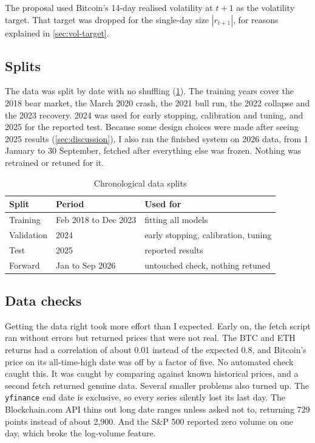 The proposal used Bitcoin's 14-day realised volatility at $t+1$ as the volatility target. That target was dropped for the single-day size $|r_{t+1}|$, for reasons explained in \cref{sec:vol-target}.

\subsection{Splits}

The data was split by date with no shuffling (\cref{tab:splits}). The training years cover the 2018 bear market, the March 2020 crash, the 2021 bull run, the 2022 collapse and the 2023 recovery. 2024 was used for early stopping, calibration and tuning, and 2025 for the reported test. Because some design choices were made after seeing 2025 results (\cref{sec:discussion}), I also ran the finished system on 2026 data, from 1 January to 30 September, fetched after everything else was frozen. Nothing was retrained or retuned for it.

\begin{table}[!t]
  \centering
  \caption{Chronological data splits}
  \label{tab:splits}
  \footnotesize
  \begin{tabularx}{\columnwidth}{@{}llX@{}}
    \toprule
    Split & Period & Used for \\
    \midrule
    Training   & Feb 2018 to Dec 2023 & fitting all models \\
    Validation & 2024 & early stopping, calibration, tuning \\
    Test       & 2025 & reported results \\
    Forward    & Jan to Sep 2026 & untouched check, nothing retuned \\
    \bottomrule
  \end{tabularx}
\end{table}

\subsection{Data checks}

Getting the data right took more effort than I expected. Early on, the fetch script ran without errors but returned prices that were not real. The BTC and ETH returns had a correlation of about 0.01 instead of the expected 0.8, and Bitcoin's price on its all-time-high date was off by a factor of five. No automated check caught this. It was caught by comparing against known historical prices, and a second fetch returned genuine data. Several smaller problems also turned up. The \texttt{yfinance} end date is exclusive, so every series silently lost its last day. The Blockchain.com API thins out long date ranges unless asked not to, returning 729 points instead of about 2,900. And the S\&P 500 reported zero volume on one day, which broke the log-volume feature.

